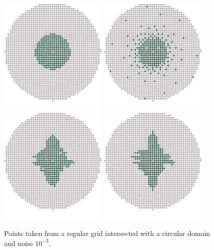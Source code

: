 \documentclass[review,supplement,onefignum,onetabnum]{siamonline220329}
\begin{document}
\begin{figure}[H]
  \centering
  \includegraphics{figures/precompiled/sphere_1e-3/points_1.pdf}%
  \quad
  \includegraphics{figures/precompiled/sphere_1e-3/points_2.pdf}%
  \quad
  \includegraphics{figures/precompiled/sphere_1e-3/points_3.pdf}%
  \quad
  \includegraphics{figures/precompiled/sphere_1e-3/points_4.pdf}%
  \caption{%
    Points taken from a regular grid intersected
    with a circular domain and noise \( 10^{-3} \).
  }
\end{figure}
\end{document}
